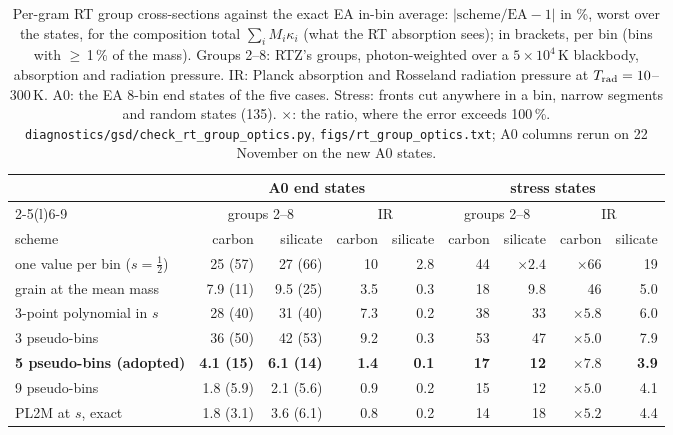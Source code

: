 \documentclass[11pt,a4paper]{article}
\begin{document}
\begin{table}[H]
\centering\small
\caption{Per-gram RT group cross-sections against the exact EA in-bin average: $|\mathrm{scheme}/\mathrm{EA}-1|$ in
\%, worst over the states, for the composition total $\sum_i M_i\kappa_i$ (what the RT absorption sees); in brackets,
per bin (bins with $\ge$\,1\,\% of the mass). Groups 2--8: RTZ's groups, photon-weighted over a $5\times10^4$\,K
blackbody, absorption and radiation pressure. IR: Planck absorption and Rosseland radiation pressure at
$T_{\rm rad} = 10$--300\,K. A0: the EA 8-bin end states of the five cases. Stress: fronts cut anywhere in a bin, narrow
segments and random states (135). $\times$: the ratio, where the error exceeds 100\,\%.
\texttt{diagnostics/gsd/check\_rt\_group\_optics.py}, \texttt{figs/rt\_group\_optics.txt}; A0 columns rerun on 22
November on the new A0 states.}\label{tab:rtgroups}
\begin{tabular}{@{}l rr rr rr rr@{}}
\toprule
 & \multicolumn{4}{c}{A0 end states} & \multicolumn{4}{c}{stress states} \\
\cmidrule(lr){2-5}\cmidrule(l){6-9}
 & \multicolumn{2}{c}{groups 2--8} & \multicolumn{2}{c}{IR} & \multicolumn{2}{c}{groups 2--8} & \multicolumn{2}{c}{IR} \\
scheme & carbon & silicate & carbon & silicate & carbon & silicate & carbon & silicate \\
\midrule
one value per bin ($s=\tfrac12$) & 25 (57) & 27 (66) & 10 & 2.8 & 44 & $\times2.4$ & $\times66$ & 19 \\
grain at the mean mass & 7.9 (11) & 9.5 (25) & 3.5 & 0.3 & 18 & 9.8 & 46 & 5.0 \\
3-point polynomial in $s$ & 28 (40) & 31 (40) & 7.3 & 0.2 & 38 & 33 & $\times5.8$ & 6.0 \\
3 pseudo-bins & 36 (50) & 42 (53) & 9.2 & 0.3 & 53 & 47 & $\times5.0$ & 7.9 \\
\textbf{5 pseudo-bins (adopted)} & \textbf{4.1 (15)} & \textbf{6.1 (14)} & \textbf{1.4} & \textbf{0.1} & \textbf{17} &
  \textbf{12} & $\boldsymbol{\times7.8}$ & \textbf{3.9} \\
9 pseudo-bins & 1.8 (5.9) & 2.1 (5.6) & 0.9 & 0.2 & 15 & 12 & $\times5.0$ & 4.1 \\
PL2M at $s$, exact & 1.8 (3.1) & 3.6 (6.1) & 0.8 & 0.2 & 14 & 18 & $\times5.2$ & 4.4 \\
\bottomrule
\end{tabular}
\end{table}
\end{document}
